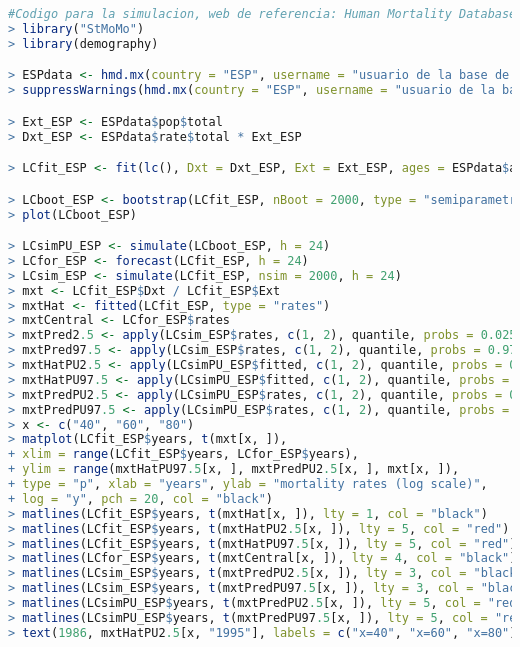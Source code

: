 \begin{lstlisting}[language=R, caption=C\'odigo R para modelo de simulaci\'on estoc\'astica de mortalidad correspondiente a la sección 2.3]
#Codigo para la simulacion, web de referencia: Human Mortality Database en www.mortality.org
> library("StMoMo")
> library(demography)

> ESPdata <- hmd.mx(country = "ESP", username = "usuario de la base de datos", password = password )
> suppressWarnings(hmd.mx(country = "ESP", username = "usuario de la base de datos", password = "password"))

> Ext_ESP <- ESPdata$pop$total
> Dxt_ESP <- ESPdata$rate$total * Ext_ESP

> LCfit_ESP <- fit(lc(), Dxt = Dxt_ESP, Ext = Ext_ESP, ages = ESPdata$age, years = ESPdata$year, ages.fit = 0:90, years.fit = 1985:2014)

> LCboot_ESP <- bootstrap(LCfit_ESP, nBoot = 2000, type = "semiparametric")
> plot(LCboot_ESP)

> LCsimPU_ESP <- simulate(LCboot_ESP, h = 24)
> LCfor_ESP <- forecast(LCfit_ESP, h = 24)
> LCsim_ESP <- simulate(LCfit_ESP, nsim = 2000, h = 24)
> mxt <- LCfit_ESP$Dxt / LCfit_ESP$Ext
> mxtHat <- fitted(LCfit_ESP, type = "rates")
> mxtCentral <- LCfor_ESP$rates
> mxtPred2.5 <- apply(LCsim_ESP$rates, c(1, 2), quantile, probs = 0.025)
> mxtPred97.5 <- apply(LCsim_ESP$rates, c(1, 2), quantile, probs = 0.975)
> mxtHatPU2.5 <- apply(LCsimPU_ESP$fitted, c(1, 2), quantile, probs = 0.025)
> mxtHatPU97.5 <- apply(LCsimPU_ESP$fitted, c(1, 2), quantile, probs = 0.975)
> mxtPredPU2.5 <- apply(LCsimPU_ESP$rates, c(1, 2), quantile, probs = 0.025)
> mxtPredPU97.5 <- apply(LCsimPU_ESP$rates, c(1, 2), quantile, probs = 0.975)
> x <- c("40", "60", "80")
> matplot(LCfit_ESP$years, t(mxt[x, ]),
+ xlim = range(LCfit_ESP$years, LCfor_ESP$years),
+ ylim = range(mxtHatPU97.5[x, ], mxtPredPU2.5[x, ], mxt[x, ]),
+ type = "p", xlab = "years", ylab = "mortality rates (log scale)",
+ log = "y", pch = 20, col = "black")
> matlines(LCfit_ESP$years, t(mxtHat[x, ]), lty = 1, col = "black")
> matlines(LCfit_ESP$years, t(mxtHatPU2.5[x, ]), lty = 5, col = "red")
> matlines(LCfit_ESP$years, t(mxtHatPU97.5[x, ]), lty = 5, col = "red")
> matlines(LCfor_ESP$years, t(mxtCentral[x, ]), lty = 4, col = "black")
> matlines(LCsim_ESP$years, t(mxtPredPU2.5[x, ]), lty = 3, col = "black")
> matlines(LCsim_ESP$years, t(mxtPredPU97.5[x, ]), lty = 3, col = "black")
> matlines(LCsimPU_ESP$years, t(mxtPredPU2.5[x, ]), lty = 5, col = "red")
> matlines(LCsimPU_ESP$years, t(mxtPredPU97.5[x, ]), lty = 5, col = "red")
> text(1986, mxtHatPU2.5[x, "1995"], labels = c("x=40", "x=60", "x=80"))
\end{lstlisting}

